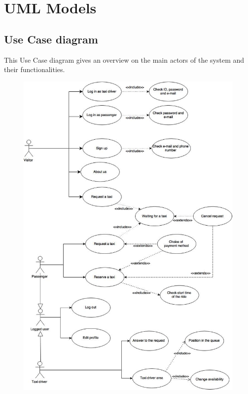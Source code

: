 \documentclass[18pt,oneside,a4paper, titlepage]{article}
\begin{document}
\section{UML Models}
	\subsection{Use Case diagram}
	This Use Case diagram gives an overview on the main actors of the system and their functionalities.
	\\
	\begin{figure}[h]
		\centering
		\includegraphics[scale=0.4]{Diagrams/UseCase2.jpg}
		
	\end{figure}
\newpage
\end{document}
